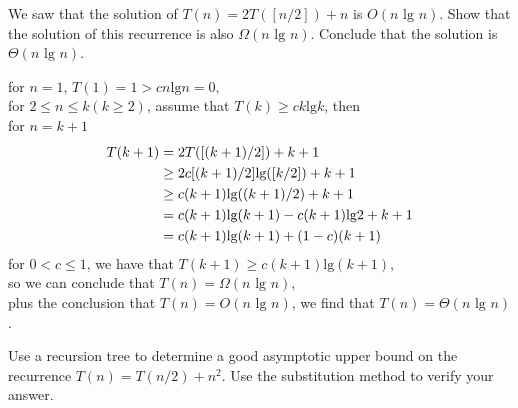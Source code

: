 \documentclass[12pt, a4paper, UTF8]{ctexart}
\begin{document}
\begin{problem}[TC: exercise 4,3-3]
  We saw that the solution of $T(n) = 2T([n/2]) + n$ is $O(n\text{ lg }n)$. 
  Show that the solution of this recurrence is also $\Omega(n\text{ lg }n)$. 
  Conclude that the solution is $\Theta(n\text{ lg }n)$.
\end{problem}

\begin{solution}
  for $n = 1$, $T(1) = 1 > cn \text{lg} n = 0,$\\
  for $2 \leq n \leq k(k \geq 2)$, assume that $T(k) \geq ck \text{lg} k$, then\\
  for $n = k + 1$
  \begin{align}
      T(k + 1) & = 2T([(k + 1)/2]) + k + 1 \notag \\
               & \geq 2c[(k + 1)/2]\text{lg}([k/2]) + k + 1 \notag \\
               & \geq c(k + 1)\text{lg}((k + 1)/2) + k + 1 \notag \\
               & = c(k + 1)\text{lg}(k + 1) - c(k + 1)\text{lg}2 + k + 1 \notag \\
               & = c(k + 1)\text{lg}(k + 1) + (1 - c)(k + 1) \notag
  \end{align}
  for $0 < c \leq 1$, we have that $T(k + 1) \geq c(k + 1)\text{lg}(k + 1),$\\
  so we can conclude that $T(n) = \Omega(n\text{ lg }n),$\\
  plus the conclusion that $T(n) = O(n\text{ lg }n)$, we find that $T(n) = \Theta(n\text{ lg }n)$.
\end{solution}
\begin{problem}[TC: exercise 4.4-2]
  Use a recursion tree to determine a good asymptotic upper bound on the 
  recurrence $T(n) = T(n/2) + n^{2}$. Use the substitution method to verify 
  your answer.	
\end{problem}

\end{document}
